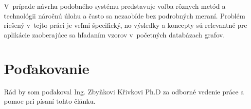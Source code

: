 \documentclass[slovak]{ExcelAtFIT} %
\begin{document}
V~prípade návrhu podobného systému predstavuje voľba rôznych metód a technológii náročnú úlohu a často sa nezaobíde bez podrobných meraní. Problém riešený v~tejto práci je veľmi špecifický, no výsledky a koncepty sú relevantné pre aplikácie zaoberajúce sa hľadaním vzorov v~početných databázach grafov. 

\section*{Poďakovanie}
Rád by som poďakoval Ing. Zbyňkovi Křivkovi Ph.D za odborné vedenie práce a pomoc pri písaní tohto článku.




\end{document}
